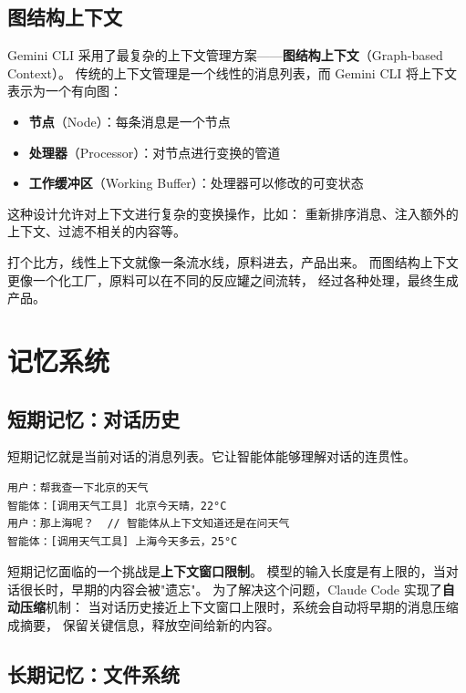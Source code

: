 \subsection{图结构上下文}

Gemini CLI 采用了最复杂的上下文管理方案——\textbf{图结构上下文}（Graph-based Context）。
传统的上下文管理是一个线性的消息列表，而 Gemini CLI 将上下文表示为一个有向图：

\begin{itemize}
    \item \textbf{节点}（Node）：每条消息是一个节点
    \item \textbf{处理器}（Processor）：对节点进行变换的管道
    \item \textbf{工作缓冲区}（Working Buffer）：处理器可以修改的可变状态
\end{itemize}

这种设计允许对上下文进行复杂的变换操作，比如：
重新排序消息、注入额外的上下文、过滤不相关的内容等。

打个比方，线性上下文就像一条流水线，原料进去，产品出来。
而图结构上下文更像一个化工厂，原料可以在不同的反应罐之间流转，
经过各种处理，最终生成产品。

\section{记忆系统}

\subsection{短期记忆：对话历史}

短期记忆就是当前对话的消息列表。它让智能体能够理解对话的连贯性。

\begin{verbatim}
用户：帮我查一下北京的天气
智能体：[调用天气工具] 北京今天晴，22°C
用户：那上海呢？  // 智能体从上下文知道还是在问天气
智能体：[调用天气工具] 上海今天多云，25°C
\end{verbatim}

短期记忆面临的一个挑战是\textbf{上下文窗口限制}。
模型的输入长度是有上限的，当对话很长时，早期的内容会被"遗忘"。
为了解决这个问题，Claude Code 实现了\textbf{自动压缩}机制：
当对话历史接近上下文窗口上限时，系统会自动将早期的消息压缩成摘要，
保留关键信息，释放空间给新的内容。

\subsection{长期记忆：文件系统}

